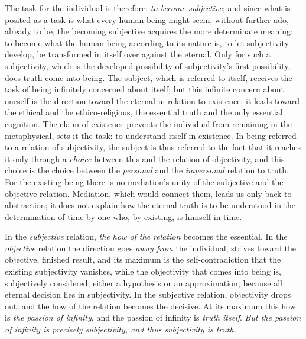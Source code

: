 \documentclass[12pt,a4paper]{book}
\begin{document}
The task for the individual is therefore: \emph{to become subjective}; and
since what is posited as a task is what every human being might seem,
without further ado, already to be, the becoming subjective acquires
the more determinate meaning: to become what the human being according
to its nature is, to let subjectivity develop, be transformed in itself
over against the eternal. Only for such a subjectivity, which is the
developed possibility of subjectivity's first possibility, does truth
come into being. The subject, which is referred to itself, receives the
task of being infinitely concerned about itself; but this infinite
concern about oneself is the direction toward the eternal in relation to
existence; it leads toward the ethical and the ethico-religious, the
essential truth and the only essential cognition. The claim of existence
prevents the individual from remaining in the metaphysical, sets it the
task: to understand itself in existence. In being referred to a relation
of subjectivity, the subject is thus referred to the fact that it
reaches it only through a \emph{choice} between this and the relation of
objectivity, and this choice is the choice between the \emph{personal} and the
\emph{impersonal} relation to truth. For the existing being there is no
mediation's unity of the subjective and the objective relation.
Mediation, which would connect them, leads us only back to abstraction;
it does not explain how the eternal truth is to be understood in the
determination of time by one who, by existing, is himself in time.

In the \emph{subjective} relation, \emph{the how of the relation} becomes the
essential. In the \emph{objective} relation the direction goes \emph{away from} the
individual, strives toward the objective, finished result, and its
maximum is the self-contradiction that the existing subjectivity
vanishes, while the objectivity that comes into being is, subjectively
considered, either a hypothesis or an approximation, because all
eternal decision lies in subjectivity. In the subjective relation,
objectivity drops out, and the how of the relation becomes the
decisive. At its maximum this how is \emph{the passion of infinity}, and the
passion of infinity is \emph{truth itself}. \emph{But the passion of infinity is
precisely subjectivity, and thus subjectivity is truth.}
\end{document}

